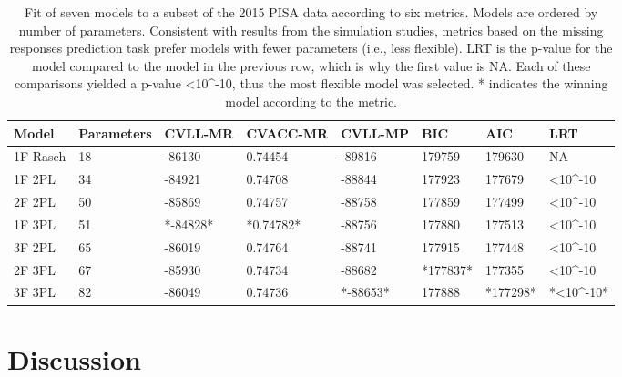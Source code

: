 \documentclass[
  english,
  man,floatsintext]{apa7}
\begin{document}
\setlength{\tabcolsep}{2pt}
\begin{table}
\caption{Fit of seven models to a subset of the 2015 PISA data according to six metrics. Models are ordered by number of parameters. Consistent with results from the simulation studies, metrics based on the missing responses prediction task prefer models with fewer parameters (i.e., less flexible). LRT is the p-value for the model compared to the model in the previous row, which is why the first value is NA. Each of these comparisons yielded a p-value <10\textasciicircum{}-10, thus the most flexible model was selected. * indicates the winning model according to the metric.}
\centering
\begin{small}
\begin{tabular}[t]{llllllll}
\toprule
Model & Parameters & CVLL-MR & CVACC-MR & CVLL-MP & BIC & AIC & LRT\\
\midrule
1F Rasch & 18 & -86130 & 0.74454   & -89816 & 179759  & 179630 & NA\\
1F 2PL & 34 & -84921 & 0.74708     & -88844 & 177923  & 177679 & <10\textasciicircum{}-10\\
2F 2PL & 50 & -85869 & 0.74757     & -88758 & 177859  & 177499 & <10\textasciicircum{}-10\\
1F 3PL & 51 & *-84828* & *0.74782* & -88756 & 177880  & 177513 & <10\textasciicircum{}-10\\
3F 2PL & 65 & -86019 & 0.74764     & -88741 & 177915  & 177448 & <10\textasciicircum{}-10\\
2F 3PL & 67 & -85930 & 0.74734     & -88682 & *177837*  & 177355 & <10\textasciicircum{}-10\\
3F 3PL & 82 & -86049 & 0.74736     & *-88653* & 177888  & *177298* & *<10\textasciicircum{}-10*\\
\bottomrule
\end{tabular}
\end{small}
\label{tab:inpractice}
\end{table}

\hypertarget{dis}{%
\section{Discussion}\label{dis}}
\end{document}
